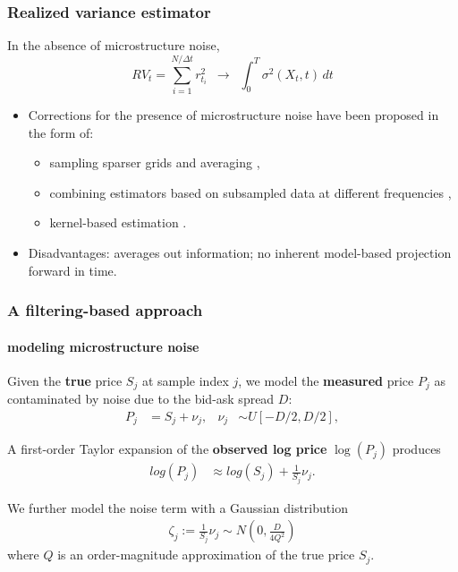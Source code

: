 \documentclass{beamer}
\begin{document}
\begin{frame}
  \frametitle{Realized variance estimator}
  In the absence of microstructure noise, 
  \[
    RV_t = \sum_{i=1}^{N/\Delta t} r_{t_i}^2 \,\,\, \to \,\,\, \displaystyle \int_{0}^T \sigma^2\left(X_t, t\right)\, dt
  \]
  
  \begin{itemize}
  \item Corrections for the presence of microstructure noise have been
    proposed in the form of:
    \begin{itemize}
    \item sampling sparser grids and averaging \cite{zhang2005tale},
    \item combining estimators based on subsampled data at different frequencies \cite{ait2011ultra},
    \item kernel-based estimation \cite{hansen2006realized, barndorff2008designing}.
    \end{itemize}
  \item Disadvantages: averages out information; no inherent
    model-based projection forward in time.
  \end{itemize}
\end{frame}
\begin{frame}
  \frametitle{A filtering-based approach}
  \framesubtitle{modeling microstructure noise}

  Given the \textbf{true} price $S_j$ at sample index $j$, we model
  the \textbf{measured} price $P_j$ as contaminated by noise due to
  the bid-ask spread $D$:
  \begin{align*}
    P_j &= S_j + \nu_j,& \nu_j &\sim U[-D/2, D/2],
  \end{align*}

  A first-order Taylor expansion of the \textbf{observed log price} $\log(P_j)$ produces
  \begin{align*}
    log(P_j) &\approx log(S_j) + \frac{1}{S_j}\nu_j.
  \end{align*}

  We further model the noise term with a Gaussian distribution
  \begin{align*}
    \zeta_j := \frac{1}{S_j}\nu_j \sim N\left(0, \frac{D}{4Q^2} \right)
  \end{align*}
  where $Q$ is an order-magnitude approximation of the true price
  $S_j$.
\end{frame}
\end{document}
